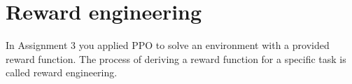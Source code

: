 \section{Reward engineering}

In Assignment 3 you applied PPO to solve an environment with a provided reward function. The process of deriving a reward function for a specific task is called reward engineering.

\begin{enumerate}[(a)]

	

	

	

	

	

	

	

\end{enumerate}

\clearpage
